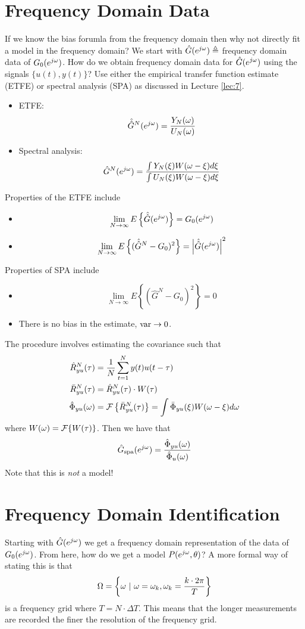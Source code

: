 \section{Frequency Domain Data}
If we know the bias forumla from the frequency domain then why not directly fit a model in the frequency domain? We start with $\hat{G}(e^{j\omega}) \triangleq$ frequency domain data of $G_0(e^{j\omega})$. How do we obtain frequency domain data for $\hat{G}(e^{j\omega})$ using the signals $\{u(t),y(t)\}$? Use either the empirical transfer function estimate (ETFE) or spectral analysis (SPA) as discussed in Lecture \ref{lec:7}.
\begin{itemize}
\item ETFE:
$$\hat{\hat{G}}^N(e^{j\omega}) = \frac{Y_N(\omega)}{U_N(\omega)}$$
\item Spectral analysis:
$$\hat{G}^N(e^{j\omega}) = \frac{\int Y_N(\xi)W(\omega-\xi)d\xi}{\int U_N(\xi)W(\omega-\xi)d\xi}$$
\end{itemize}
Properties of the ETFE include
\begin{itemize}
\item $$\lim_{N\to\infty}E\left\lbrace \hat{\hat{G}}(e^{j\omega})\right\rbrace = G_0(e^{j\omega})$$
\item $$\lim_{N\to\infty}E\left\lbrace (\hat{\hat{G}}^N-G_0)^2\right\rbrace = \left|\hat{\hat{G}}(e^{j\omega})\right|^2$$
\end{itemize}
Properties of SPA include
\begin{itemize}
\item $$\lim_{N\to\infty}E\left\lbrace (\hat{G}^N-G_0)^2\right\rbrace = 0$$
\item There is no bias in the estimate, $\text{var}\to0$.
\end{itemize}
The procedure involves estimating the covariance such that
\begin{align*}
\hat{R}_{yu}^N(\tau) &= \frac{1}{N}\sum_{t=1}^N y(t)u(t-\tau) \\
\bar{R}_{yu}^N(\tau) &= \hat{R}_{yu}^N(\tau)\cdot W(\tau) \\
\hat{\Phi}_{yu}(\omega) &= \mathcal{F}\left\lbrace \bar{R}_{yu}^N(\tau)\right\rbrace = \int\bar{\Phi}_{yu}(\xi) W(\omega-\xi)d\omega
\end{align*}
where $W(\omega) = \mathcal{F}\{W(\tau)\}$. Then we have that
$$\hat{G}_{\text{spa}}(e^{j\omega}) = \frac{\hat{\Phi}_{yu}(\omega)}{\hat{\Phi}_u(\omega)}$$
Note that this is \textit{not} a model!

\section{Frequency Domain Identification}
Starting with $\hat{G}(e^{j\omega})$ we get a frequency domain representation of the data of $G_0(e^{j\omega})$. From here, how do we get a model $P(e^{j\omega},\theta)$? A more formal way of stating this is that
$$\Omega = \left\lbrace \omega ~|~ \omega=\omega_k, \omega_k=\frac{k\cdot 2\pi}{T} \right\rbrace$$
is a frequency grid where $T=N\cdot\Delta T$. This means that the longer measurements are recorded the finer the resolution of the frequency grid.

